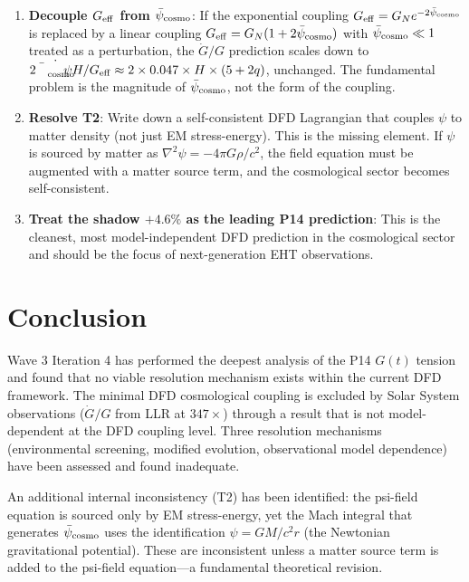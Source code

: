 \documentclass[11pt]{article}
\newcommand{\psicosmo}{\bar{\psi}_{\rm cosmo}}
\begin{document}
\begin{enumerate}
\item \textbf{Decouple $G_{\rm eff}$ from $\psicosmo$}: If the exponential
  coupling $G_{\rm eff} = G_N e^{-2\psicosmo}$ is replaced by a linear
  coupling $G_{\rm eff} = G_N(1 + 2\psicosmo)$ with $\psicosmo \ll 1$
  treated as a perturbation, the $\dot{G}/G$ prediction scales down to
  $2\dot{\psicosmo} H/G_{\rm eff} \approx 2\times 0.047\times H\times(5+2q)$,
  unchanged. The fundamental problem is the magnitude of $\psicosmo$, not
  the form of the coupling.
\item \textbf{Resolve T2}: Write down a self-consistent DFD Lagrangian that
  couples $\psi$ to matter density (not just EM stress-energy). This is
  the missing element. If $\psi$ is sourced by matter as
  $\nabla^2\psi = -4\pi G\rho/c^2$, the field equation must be augmented
  with a matter source term, and the cosmological sector becomes self-consistent.
\item \textbf{Treat the shadow $+4.6\%$ as the leading P14 prediction}: This
  is the cleanest, most model-independent DFD prediction in the cosmological
  sector and should be the focus of next-generation EHT observations.
\end{enumerate}

\section{Conclusion}
\label{sec:conclusion}

Wave 3 Iteration 4 has performed the deepest analysis of the P14 $G(t)$ tension
and found that no viable resolution mechanism exists within the current DFD
framework. The minimal DFD cosmological coupling is excluded by Solar System
observations ($\dot{G}/G$ from LLR at $347\times$) through a result that is
not model-dependent at the DFD coupling level. Three resolution mechanisms
(environmental screening, modified evolution, observational model dependence)
have been assessed and found inadequate.

An additional internal inconsistency (T2) has been identified: the psi-field
equation is sourced only by EM stress-energy, yet the Mach integral that
generates $\psicosmo$ uses the identification $\psi = GM/c^2 r$ (the Newtonian
gravitational potential). These are inconsistent unless a matter source term
is added to the psi-field equation---a fundamental theoretical revision.
\end{document}
